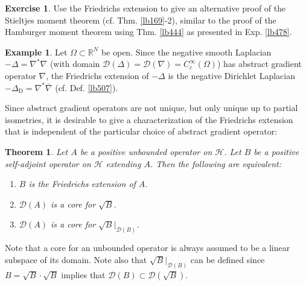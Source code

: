 \documentclass[12pt,b5paper,notitlepage]{article}
\theoremstyle{definition}
\newtheorem{eg}[df]{Example}
\newtheorem{exe}[df]{Exercise}
\theoremstyle{plain}
\newtheorem{thm}[df]{Theorem}
\newcommand{\ovl}{\overline}
\newcommand{\Dom}{\mathscr{D}}
\newcommand{\Rbb}{\mathbb R}
\newcommand{\MH}{\mathcal H}
\newcommand{\DD}{\Delta_{\mathrm D}}
\numberwithin{equation}{section}
\begin{document}
\begin{exe}\label{lb556}
Use the Friedrichs extension to give an alternative proof of the Stieltjes moment theorem (cf. Thm. \ref{lb169}-2), similar to the proof of the Hamburger moment theorem using Thm. \ref{lb444} as presented in Exp. \ref{lb478}.
\end{exe}

\begin{eg}
Let $\Omega\subset\Rbb^N$ be open. Since the negative smooth Laplacian $-\Delta=\nabla^*\nabla$ (with domain $\Dom(\Delta)=\Dom(\nabla)=C_c^\infty(\Omega)$) has abstract gradient operator $\nabla$, the Friedrichs extension of $-\Delta$ is the negative Dirichlet Laplacian $-\DD=\nabla^*\ovl\nabla$ (cf. Def. \ref{lb507}).
\end{eg}



Since abstract gradient operators are not unique, but only unique up to partial isometries, it is desirable to give a characterization of the Friedrichs extension that is independent of the particular choice of abstract gradient operator:

\begin{thm}\label{lb473}
Let $A$ be a positive unbounded operator on $\MH$. Let $B$ be a positive self-adjoint operator on $\MH$ extending $A$. Then the following are equivalent:
\begin{enumerate}[label=(\arabic*)]
\item $B$ is the Friedrichs extension of $A$.
\item $\Dom(A)$ is a core for $\sqrt B$.
\item $\Dom(A)$ is a core for $\sqrt B\big|_{\Dom(B)}$.
\end{enumerate}
\end{thm}

Note that a core for an unbounded operator is always assumed to be a linear subspace of its domain. Note also that $\sqrt B\big|_{\Dom(B)}$ can be defined since $B=\sqrt B\cdot\sqrt B$ implies that $\Dom(B)\subset\Dom(\sqrt B)$.
\end{document}
